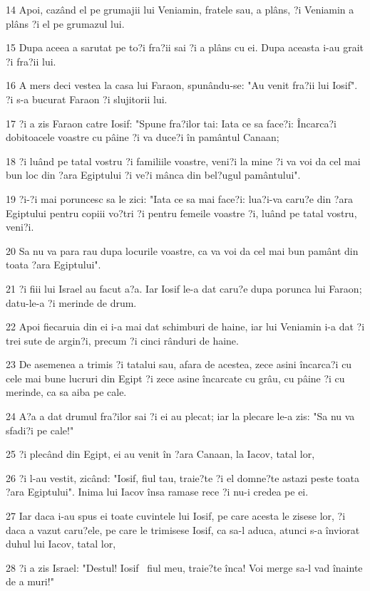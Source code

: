 \par 14 Apoi, cazând el pe grumajii lui Veniamin, fratele sau, a plâns, ?i Veniamin a plâns ?i el pe grumazul lui.
\par 15 Dupa aceea a sarutat pe to?i fra?ii sai ?i a plâns cu ei. Dupa aceasta i-au grait ?i fra?ii lui.
\par 16 A mers deci vestea la casa lui Faraon, spunându-se: "Au venit fra?ii lui Iosif". ?i s-a bucurat Faraon ?i slujitorii lui.
\par 17 ?i a zis Faraon catre Iosif: "Spune fra?ilor tai: Iata ce sa face?i: Încarca?i dobitoacele voastre cu pâine ?i va duce?i în pamântul Canaan;
\par 18 ?i luând pe tatal vostru ?i familiile voastre, veni?i la mine ?i va voi da cel mai bun loc din ?ara Egiptului ?i ve?i mânca din bel?ugul pamântului".
\par 19 ?i-?i mai poruncesc sa le zici: "Iata ce sa mai face?i: lua?i-va caru?e din ?ara Egiptului pentru copiii vo?tri ?i pentru femeile voastre ?i, luând pe tatal vostru, veni?i.
\par 20 Sa nu va para rau dupa locurile voastre, ca va voi da cel mai bun pamânt din toata ?ara Egiptului".
\par 21 ?i fiii lui Israel au facut a?a. Iar Iosif le-a dat caru?e dupa porunca lui Faraon; datu-le-a ?i merinde de drum.
\par 22 Apoi fiecaruia din ei i-a mai dat schimburi de haine, iar lui Veniamin i-a dat ?i trei sute de argin?i, precum ?i cinci rânduri de haine.
\par 23 De asemenea a trimis ?i tatalui sau, afara de acestea, zece asini încarca?i cu cele mai bune lucruri din Egipt ?i zece asine încarcate cu grâu, cu pâine ?i cu merinde, ca sa aiba pe cale.
\par 24 A?a a dat drumul fra?ilor sai ?i ei au plecat; iar la plecare le-a zis: "Sa nu va sfadi?i pe cale!"
\par 25 ?i plecând din Egipt, ei au venit în ?ara Canaan, la Iacov, tatal lor,
\par 26 ?i l-au vestit, zicând: "Iosif, fiul tau, traie?te ?i el domne?te astazi peste toata ?ara Egiptului". Inima lui Iacov însa ramase rece ?i nu-i credea pe ei.
\par 27 Iar daca i-au spus ei toate cuvintele lui Iosif, pe care acesta le zisese lor, ?i daca a vazut caru?ele, pe care le trimisese Iosif, ca sa-l aduca, atunci s-a înviorat duhul lui Iacov, tatal lor,
\par 28 ?i a zis Israel: "Destul! Iosif  fiul meu, traie?te înca! Voi merge sa-l vad înainte de a muri!"

